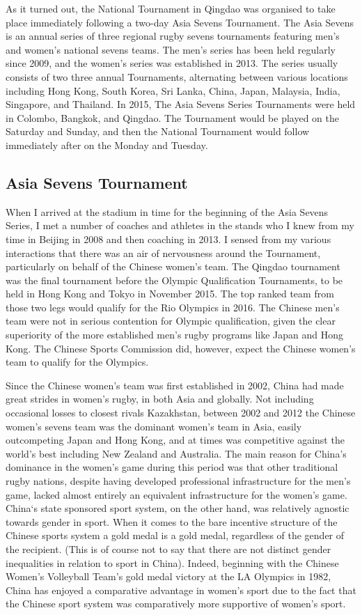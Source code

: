 \begin{CJK}{UTF8}{gbsn}
As it turned out, the National Tournament in Qingdao was organised to take place immediately following a two-day Asia Sevens Tournament.  The Asia Sevens is an annual series of three regional rugby sevens tournaments featuring men's and women's national sevens teams.  The men's series has been held regularly since 2009, and the women's series was established in 2013. The series usually consists of two three annual Tournaments, alternating between various locations including Hong Kong, South Korea, Sri Lanka, China, Japan, Malaysia, India, Singapore, and Thailand.  In 2015, The Asia Sevens Series Tournaments were held in Colombo, Bangkok, and Qingdao. The Tournament would be played on the Saturday and Sunday, and then the National Tournament would follow immediately after on the Monday and Tuesday.

\subsection{Asia Sevens Tournament}
When I arrived at the stadium in time for the beginning of the Asia Sevens Series, I met a number of coaches and athletes in the stands who I knew from my time in Beijing in 2008 and then coaching in 2013. I sensed from my various interactions that there was an air of nervousness around the Tournament, particularly on behalf of the Chinese women's team.   The Qingdao tournament was the final tournament before the Olympic Qualification Tournaments, to be held in Hong Kong and Tokyo in November 2015.  The top ranked team from those two legs would qualify for the Rio Olympics in 2016.  The Chinese men's team were not in serious contention for Olympic qualification, given the clear superiority of the more established men's rugby programs like Japan and Hong Kong. The Chinese Sports Commission did, however, expect the Chinese women's team to qualify for the Olympics.

Since the Chinese women's team was first established in 2002, China had made great strides in women's rugby, in both Asia and globally.  Not including occasional losses to closest rivals Kazakhstan, between 2002 and 2012 the Chinese women's sevens team was the dominant women's team in Asia, easily outcompeting Japan and Hong Kong, and at times was competitive against the world's best including New Zealand and Australia.  The main reason for China's dominance in the women's game during this period was that other traditional rugby nations, despite having developed professional infrastructure for the men's game, lacked almost entirely an equivalent infrastructure for the women's game. China`s state sponsored sport system, on the other hand, was relatively agnostic towards gender in sport. When it comes to the bare incentive structure of the Chinese sports system a gold medal is a gold medal, regardless of the gender of the recipient. (This is of course not to say that there are not distinct gender inequalities in relation to sport in China).  Indeed, beginning with the Chinese Women's Volleyball Team's gold medal victory at the LA Olympics in 1982, China has enjoyed a comparative advantage in women's sport due to the fact that the Chinese sport system was comparatively more supportive of women's sport.


\end{CJK}

